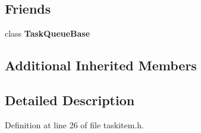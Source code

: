 \subsection*{Friends}
\begin{DoxyCompactItemize}
\item 
class {\bfseries Task\+Queue\+Base}\hypertarget{classjaspl_1_1ocl_1_1_task_item_a7cef05d602ede8ae7e967835f6965bc7}{}\label{classjaspl_1_1ocl_1_1_task_item_a7cef05d602ede8ae7e967835f6965bc7}

\end{DoxyCompactItemize}
\subsection*{Additional Inherited Members}


\subsection{Detailed Description}


Definition at line 26 of file taskitem.\+h.

